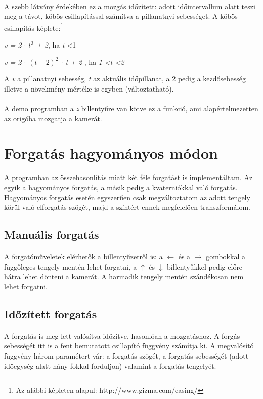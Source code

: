 \documentclass[10pt,a4paper]{article}
\begin{document}
\paragraph*{}
A szebb látvány érdekében ez a mozgás időzített: adott időintervallum alatt teszi meg a távot, köbös csillapítással számítva a pillanatnyi sebességet. A köbös csillapítás képlete:\footnote{Az alábbi képleten alapul: http://www.gizma.com/easing/}

\begin{center}
\textit{v = 2 $\cdot$ $ t^3 $ + 2}, ha \textit{t} \textless 1 

\textit{v = 2 $\cdot$ $(t-2)^2$ $\cdot$ t + 2} , ha \textit{1 \textless t \textless 2}
\end{center}
A \textit{v} a pillanatnyi sebesség, \textit{t} az aktuális időpillanat, a 2 pedig a kezdősebesség illetve a növekmény mértéke is egyben (változtatható).
\paragraph*{}
A demo programban a \textit{z} billentyűre van kötve ez a funkció, ami alapértelmezetten az origóba mozgatja a kamerát.
\section*{Forgatás hagyományos módon}
A programban az összehasonlítás miatt két féle forgatást is implementáltam. Az egyik a hagyományos forgatás, a másik pedig a kvaterniókkal való forgatás.
Hagyományos forgatás esetén egyszerűen csak megváltoztatom az adott tengely körül való elforgatás szögét, majd a színtért ennek megfelelően transzformálom.
\subsection*{Manuális forgatás}
\paragraph*{}
A forgatóműveletek elérhetők a billentyűzetről is: a $\leftarrow$ és a $\rightarrow$ gombokkal a függőleges tengely mentén lehet forgatni, a $\uparrow$ és $\downarrow$ billentyűkkel pedig előre-hátra lehet dönteni a kamerát. A harmadik tengely mentén szándékosan nem lehet forgatni.
\subsection*{Időzített forgatás}
\paragraph*{}
A forgatás is meg lett valósítva időzítve, hasonlóan a mozgatáshoz. A forgás sebességét itt is a fent bemutatott csillapító függvény számítja ki.
A megvalósító függvény három paramétert vár: a forgatás szögét, a forgatás sebességét (adott időegység alatt hány fokkal forduljon) valamint a forgatás tengelyét.
\end{document}
